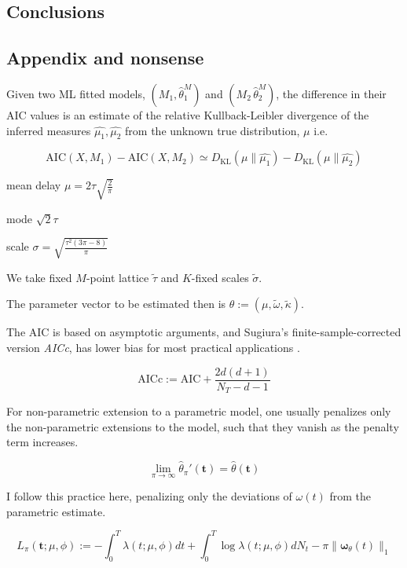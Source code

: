 \documentclass[11pt]{article}
\begin{document}
    \subsection{Conclusions}\label{conclusions}

    

    \subsection{Appendix and nonsense}\label{appendix-and-nonsense}


    Given two ML fitted models, \((M_1,\hat{\theta}^M_1)\) and
\((M_2\,\hat{\theta}^M_2)\), the difference in their AIC values is an
estimate of the relative Kullback-Leibler divergence of the inferred
measures \(\hat{\mu_1},\hat{\mu_2}\) from the unknown true distribution,
\(\mu\) i.e.

\[\mathrm{AIC}(X,M_1)-\mathrm{AIC}(X,M_2) \simeq D_\mathrm{KL}(\mu\|\hat{\mu_1}) - D_\mathrm{KL}(\mu\|\hat{\mu_2})\]

    mean delay \(\mu=2\tau \sqrt{\frac{2}{\pi}}\)

mode \(\sqrt{2}\tau\)

scale \(\sigma=\sqrt{\frac{\tau^2(3 \pi - 8)}{\pi}}\)

We take fixed \(M\)-point lattice \(\tilde{\tau}\) and \(K\)-fixed
scales \(\tilde{\sigma}.\)

The parameter vector to be estimated then is
\(\theta:=(\mu, \tilde{\omega}, \tilde{\kappa}).\)

    The AIC is based on asymptotic arguments, and Sugiura's
finite-sample-corrected version \emph{AICc}, has lower bias for most
practical applications \cite{sugiura_further_1978}.

\[{\mathrm {AICc}}:={\mathrm {AIC}}+{\frac {2d(d+1)}{N_T-d-1}}\]

    For non-parametric extension to a parametric model, one usually
penalizes only the non-parametric extensions to the model, such that
they vanish as the penalty term increases. \cite{green_penalized_1987}

\[\lim_{\pi\to\infty}\hat{\theta}_\pi'(\mathbf t) =\hat{\theta}(\mathbf t)\]

I follow this practice here, penalizing only the deviations of
\(\omega(t)\) from the parametric estimate.

\[L_\pi(\mathbf t;\mu,\phi):=-\int_0^T\lambda(t;\mu,\phi)dt + \int_0^T\log \lambda(t;\mu,\phi) dN_t - \pi\|\boldsymbol \omega_\theta(t)\|_1\]


    
    




    
    
\end{document}
